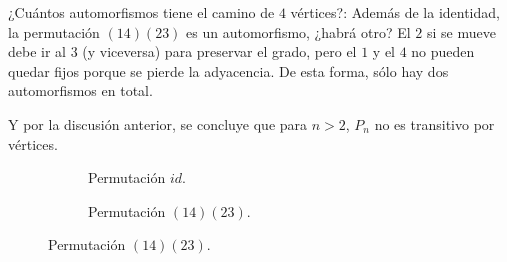 \begin{ejem}
    ¿Cuántos automorfismos tiene el camino de $4$ vértices?: Además de la identidad, la permutación $(14)(23)$ es un automorfismo, ¿habrá otro? El $2$ si se mueve debe ir al $3$ (y viceversa) para preservar el grado, pero el $1$ y el $4$ no pueden quedar fijos porque se pierde la adyacencia. De esta forma, sólo hay dos automorfismos en total.
    
    Y por la discusión anterior, se concluye que para $n > 2$, $P_n$ no es transitivo por vértices.
    
    \begin{figure}
        \begin{subfigure}[b]{0.5\textwidth}
        \centering
            \caption{Permutación $id$.}
        \end{subfigure}
        \hfill
        \begin{subfigure}[b]{0.5\textwidth}
        \centering
            \caption{Permutación $(14)(23)$.}
        \end{subfigure}
    \end{figure}
\end{ejem}
